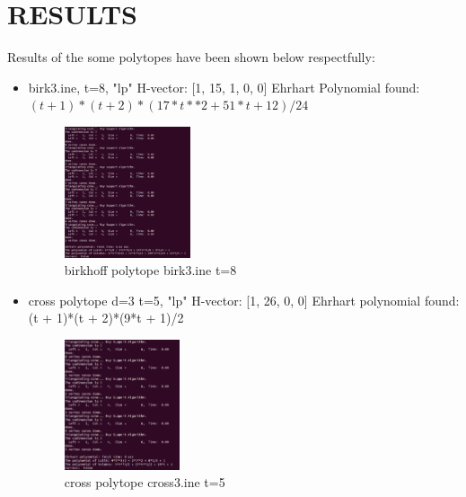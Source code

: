 \documentclass[12pt,twoside]{article}
\begin{document}
\section{RESULTS}

Results of the some polytopes have been shown below respectfully:
\begin{itemize}
	\item birk3.ine, t=8, "lp" \newline
	H-vector: [1, 15, 1, 0, 0] \newline
	Ehrhart Polynomial found: $(t + 1)*(t + 2)*(17*t**2 + 51*t + 12)/24$ \newline

	\begin{figure}[!h]
  		\centering
         	\includegraphics[width=0.35\textwidth]{birk3t8.png}
		\caption{birkhoff polytope birk3.ine t=8}
	\end{figure}

	\item cross polytope d=3 t=5, "lp" \newline
	H-vector: [1, 26, 0, 0] \newline
	Ehrhart polynomial found: (t + 1)*(t + 2)*(9*t + 1)/2 \newline
	\begin{figure}[!h]
  		\centering
         	\includegraphics[width=0.32\textwidth]{cross3t5.png}
		\caption{cross polytope cross3.ine t=5}
	\end{figure}	
		
	
\end{itemize}
\newpage
\end{document}

